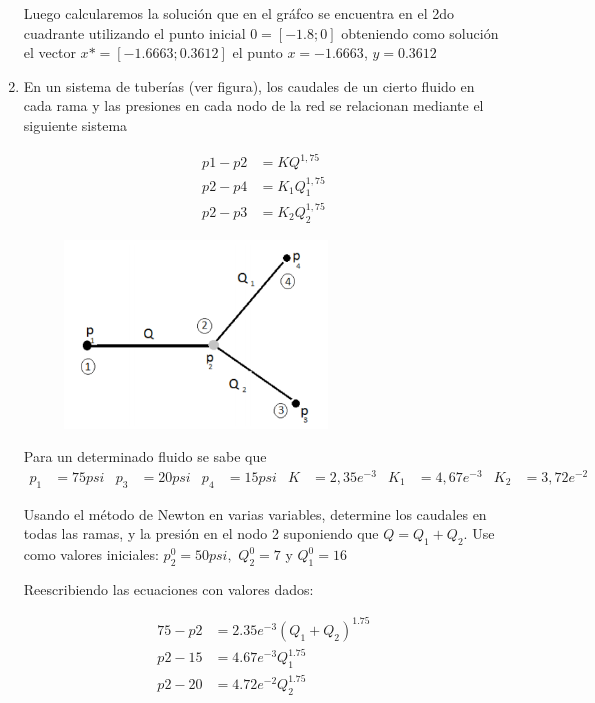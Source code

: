 \documentclass{udpreport}
\begin{document}
\begin{enumerate}
        Luego calcularemos la solución que en el gráfco se encuentra en el 2do cuadrante utilizando el punto inicial $0=[-1.8;0]$
        obteniendo como solución el vector $x*=[-1.6663;0.3612]$ el punto  $x=-1.6663$, $y=0.3612$

    
        \newpage
        
        \item En un sistema de tuberías (ver figura), los caudales de un cierto fluido en cada rama y las presiones en cada nodo de la red se relacionan mediante el siguiente sistema
        
        \begin{align*} 
            p1 - p2 &= KQ^{1,75} \\ 
            p2 - p4 &= K_1 Q_1^{1,75}\\
            p2 - p3 &= K_2 Q_2^{1,75}
        \end{align*}
        
    \begin{figure}[H]
    \centering
    \includegraphics[width=7cm]{imagenEjec}
    \end{figure}        
    
    Para un determinado fluido se sabe que
    \begin{align*}
    p_1&=75psi & p_3&=20psi &  p_4&=15psi & K&=2,35e^{-3} & K_1&=4,67e^{-3} & K_2&=3,72e^{-2}
    \end{align*}
    
    Usando el método de Newton en varias variables, determine los caudales en todas las ramas, y la presión en el nodo 2 suponiendo que $Q = Q_1 + Q_2 $. Use como valores iniciales: $ p_2^0= 50 psi,$  $Q_2^0=7$ y  $Q_1^0=16$
    
    
    Reescribiendo las ecuaciones con valores dados:
    
    \begin{align*} 
        75 - p2 &=  2.35e^{-3}(Q_1+Q_2)^{1.75} \\ 
        p2 - 15 &= 4.67e^{-3}Q_1^{1.75} \\
        p2 - 20 &= 4.72e^{-2}Q_2^{1.75}
    \end{align*}
    

\end{enumerate}
\end{document}
